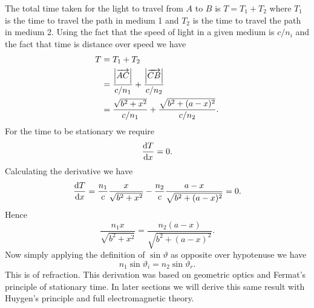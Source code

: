     The total time taken for the light to travel from \(A\) to \(B\) is \(T = T_1 + T_2\) where \(T_1\) is the time to travel the path in medium 1 and \(T_2\) is the time to travel the path in medium 2.
    Using the fact that the speed of light in a given medium is \(c/n_i\) and the fact that time is distance over speed we have
    \begin{align*}
        T &= T_1 + T_2\\
        &= \frac{\abs{\overrightarrow{AC}}}{c/n_1} + \frac{\abs{\overrightarrow{CB}}}{c/n_2}\\
        &= \frac{\sqrt{b^2 + x^2}}{c/n_1} + \frac{\sqrt{b^2 + (a - x)^2}}{c/n_2}.
    \end{align*}
    For the time to be stationary we require
    \[\dv{T}{x} = 0.\]
    Calculating the derivative we have
    \[\dv{T}{x} = \frac{n_1}{c} \frac{x}{\sqrt{b^2 + x^2}} - \frac{n_2}{c} \frac{a - x}{\sqrt{b^2 + (a - x)^2}} = 0.\]
    Hence
    \[\frac{n_1x}{\sqrt{b^2 + x^2}} = \frac{n_2(a - x)}{\sqrt{b^2 + (a - x)^2}}.\]
    Now simply applying the definition of \(\sin\vartheta\) as opposite over hypotenuse we have
    \[n_1\sin\vartheta_i = n_2\sin\vartheta_r.\]
    This is  of refraction.
    This derivation was based on geometric optics and Fermat's principle of stationary time.
    In later sections we will derive this same result with Huygen's principle and full electromagnetic theory.
    
